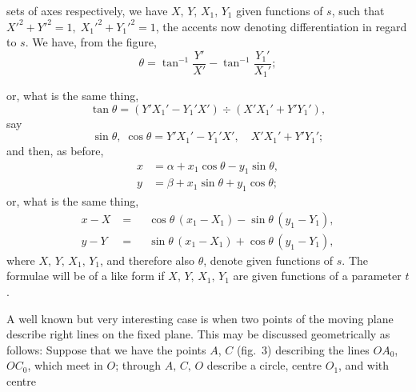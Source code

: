 \documentclass[11pt]{article}
\begin{document}
sets of axes respectively, we have $X,\,Y,\,X_1,\,Y_1$ given functions of $s$, such that
$X'^2 + Y'^2 = 1,\; X_1'^2 + Y_1'^2 = 1$, the accents now denoting differentiation in regard to $s$.
We have, from the figure,
\[
   \theta = \tan^{-1} \frac{Y'}{X'} - \tan^{-1} \frac{Y_1'}{X_1'};
\]

or, what is the same thing,
\[
   \tan\theta = (Y'X_1' - Y_1'X')\div(X'X_1' + Y'Y_1'),
\]
say
\[
   \sin\theta,\;\cos\theta = Y'X_1' - Y_1'X',\quad X'X_1' + Y'Y_1';
\]
and then, as before,
\begin{align*}
x &= \alpha + x_1 \cos\theta - y_1 \sin\theta,\\
y &= \beta  + x_1 \sin\theta + y_1 \cos\theta;
\end{align*}
or, what is the same thing,
\begin{align*}
x - X &= \phantom{-}\cos\theta\,(x_1 - X_1) - \sin\theta\,(y_1 - Y_1),\\
y - Y &= \phantom{-}\sin\theta\,(x_1 - X_1) + \cos\theta\,(y_1 - Y_1),
\end{align*}
where $X,\,Y,\,X_1,\,Y_1$, and therefore also $\theta$, denote given functions of $s$. The formulae
will be of a like form if $X,\,Y,\,X_1,\,Y_1$ are given functions of a parameter $t$.

\bigskip

A well known but very interesting case is when two points of the moving plane
describe right lines on the fixed plane. This may be discussed geometrically as
follows: Suppose that we have the points $A$, $C$ (fig.\ 3) describing the lines $OA_0$,
$OC_0$, which meet in $O$; through $A,\,C,\,O$ describe a circle, centre $O_1$, and with centre
\end{document}
